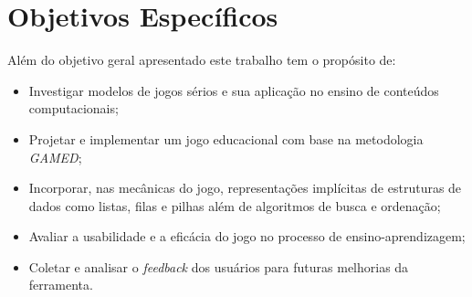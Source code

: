 \section{Objetivos Específicos}

Além do objetivo geral apresentado este trabalho tem o propósito de:

\begin{itemize}
  \item Investigar modelos de jogos sérios e sua aplicação no ensino de conteúdos computacionais;
  \item Projetar e implementar um jogo educacional com base na metodologia \emph{GAMED};
  \item Incorporar, nas mecânicas do jogo, representações implícitas de estruturas de dados como listas, filas e pilhas além de algoritmos de busca e ordenação;
  \item Avaliar a usabilidade e a eficácia do jogo no processo de ensino-aprendizagem;
  \item Coletar e analisar o \emph{feedback} dos usuários para futuras melhorias da ferramenta.
\end{itemize}
